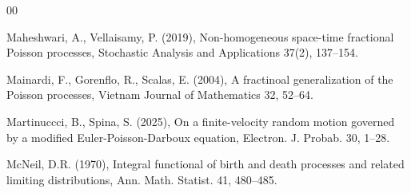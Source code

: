 \documentclass[12pt, twoside, english, headsepline]{article}
\theoremstyle{definition} %
\numberwithin{equation}{section} %
\begin{document}
{\begin{thebibliography}{00}

Maheshwari, A., Vellaisamy, P. (2019), Non-homogeneous space-time fractional Poisson processes, Stochastic Analysis and Applications 37(2), 137--154.

Mainardi, F., Gorenflo, R., Scalas, E. (2004), A fractinoal generalization of the Poisson processes, Vietnam Journal of Mathematics 32, 52--64.%
%
%
%

Martinuccci, B., Spina, S. (2025), On a finite-velocity random motion governed by a modified Euler-Poisson-Darboux equation, Electron. J. Probab. 30, 1--28.

%
%
%
McNeil, D.R. (1970), Integral functional of birth and death processes and related limiting distributions, Ann. Math. Statist. 41, 480--485.


\end{thebibliography}}
\end{document}
